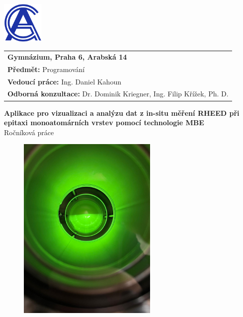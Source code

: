 \documentclass[a4paper,11pt]{article}
\begin{document}
	\thispagestyle{empty}
	
	\begin{flushleft}
		\includegraphics[width=2cm]{images/logo.png}
		\begin{tabular}[b]{@{}p{}}
			\large\textbf{Gymnázium, Praha 6, Arabská 14}\\
			\textbf{Předmět:} Programování\\
			\textbf{Vedoucí práce:} Ing. Daniel Kahoun\\
			\textbf{Odborná konzultace:} Dr. Dominik Kriegner, Ing. Filip Křížek, Ph. D. 
		\end{tabular}
	\end{flushleft}
	
	\begin{center}
		\vspace{1cm}
		{\Huge\textbf{Aplikace pro vizualizaci a analýzu dat z in-situ měření RHEED při epitaxi monoatomárních vrstev pomocí technologie MBE}}\\
		\vspace{0.5cm}
		Ročníková práce
		\vspace{0.5cm}
	\end{center}
	
	\begin{figure}[H]
		\centering
		\includegraphics[width=0.60\textwidth]{images/title.png}
	\end{figure}
	
\end{document}
